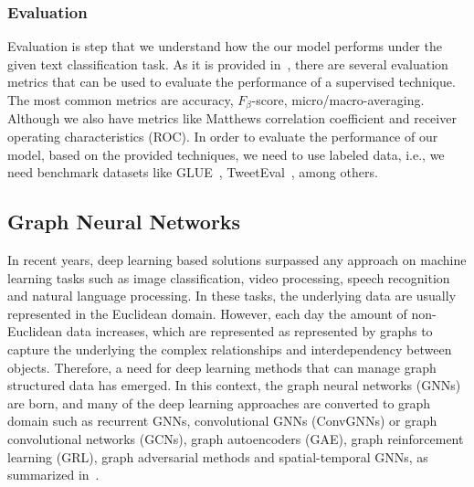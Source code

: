 \subsubsection{Evaluation}
Evaluation is step that we understand how the our model performs under the given text classification task. As it is provided in~\autocite{li20tc,minaee20tc}, there are several evaluation metrics that can be used to evaluate the performance of a supervised technique. The most common metrics are accuracy, \(F_\beta \)-score, micro/macro-averaging. Although we also have metrics like Matthews correlation coefficient and receiver operating characteristics (ROC). In order to evaluate the performance of our model, based on the provided techniques, we need to use labeled data, i.e., we need benchmark datasets like GLUE~\autocite{wang18glue}, TweetEval~\autocite{tweeteval}, among others.

\subsection{Graph Neural Networks}\label{sec:GNN}
In recent years, deep learning based solutions surpassed any approach on machine learning tasks such as image classification, video processing, speech recognition and natural language processing. In these tasks, the underlying data are usually represented in the Euclidean domain. However, each day the amount of non-Euclidean data increases, which are represented as represented by graphs to capture the underlying the complex relationships and interdependency between objects. Therefore, a need for deep learning methods that can manage graph structured data has emerged. In this context, the graph neural networks (GNNs) are born, and many of the deep learning approaches are converted to graph domain such as recurrent GNNs, convolutional GNNs (ConvGNNs) or graph convolutional networks (GCNs), graph autoencoders (GAE), graph reinforcement learning (GRL), graph adversarial methods and spatial-temporal GNNs, as summarized in~\autocite{zhou20gnn,wu21gnn,zhang18dlongraphs,sun18adversarial}.

